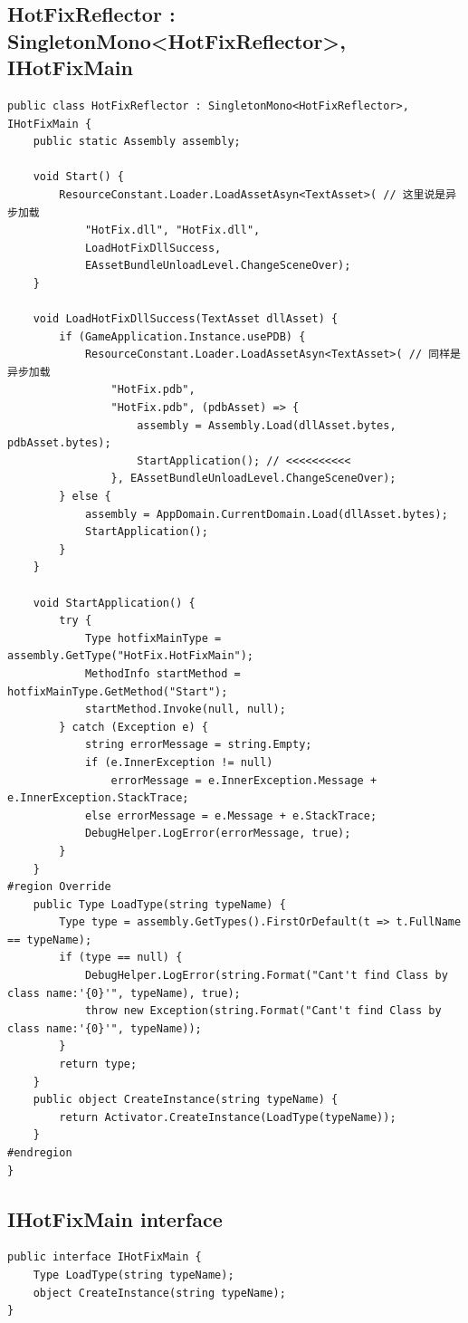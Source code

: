 \documentclass[9pt, b5paper]{article}
\begin{document}
\subsection{HotFixReflector : SingletonMono<HotFixReflector>, IHotFixMain}
\label{sec-5-7}
\begin{verbatim}
public class HotFixReflector : SingletonMono<HotFixReflector>, IHotFixMain {
    public static Assembly assembly;

    void Start() {
        ResourceConstant.Loader.LoadAssetAsyn<TextAsset>( // 这里说是异步加载
            "HotFix.dll", "HotFix.dll",
            LoadHotFixDllSuccess,
            EAssetBundleUnloadLevel.ChangeSceneOver);
    }

    void LoadHotFixDllSuccess(TextAsset dllAsset) {
        if (GameApplication.Instance.usePDB) {
            ResourceConstant.Loader.LoadAssetAsyn<TextAsset>( // 同样是异步加载
                "HotFix.pdb",
                "HotFix.pdb", (pdbAsset) => {
                    assembly = Assembly.Load(dllAsset.bytes, pdbAsset.bytes);
                    StartApplication(); // <<<<<<<<<< 
                }, EAssetBundleUnloadLevel.ChangeSceneOver);
        } else {
            assembly = AppDomain.CurrentDomain.Load(dllAsset.bytes);
            StartApplication();
        }
    }
    
    void StartApplication() {
        try {
            Type hotfixMainType = assembly.GetType("HotFix.HotFixMain");
            MethodInfo startMethod = hotfixMainType.GetMethod("Start");
            startMethod.Invoke(null, null);
        } catch (Exception e) {
            string errorMessage = string.Empty;
            if (e.InnerException != null) 
                errorMessage = e.InnerException.Message + e.InnerException.StackTrace;
            else errorMessage = e.Message + e.StackTrace;
            DebugHelper.LogError(errorMessage, true);
        }
    }
#region Override
    public Type LoadType(string typeName) {
        Type type = assembly.GetTypes().FirstOrDefault(t => t.FullName == typeName);
        if (type == null) {
            DebugHelper.LogError(string.Format("Cant't find Class by class name:'{0}'", typeName), true);
            throw new Exception(string.Format("Cant't find Class by class name:'{0}'", typeName));
        }
        return type;
    }
    public object CreateInstance(string typeName) {
        return Activator.CreateInstance(LoadType(typeName));
    }
#endregion
}
\end{verbatim}
\subsection{IHotFixMain interface}
\label{sec-5-8}
\begin{verbatim}
public interface IHotFixMain {
    Type LoadType(string typeName);
    object CreateInstance(string typeName);
}
\end{verbatim}
\end{document}

